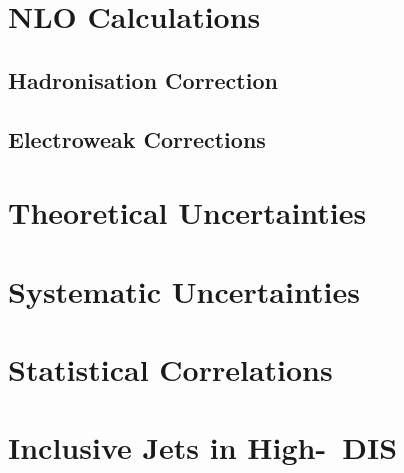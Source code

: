 \section{NLO Calculations}
\label{sec:nlopredictions}


\subsection{Hadronisation Correction}
\label{subsec:hadrcorr}

% 
\subsection{Electroweak Corrections}
\label{subsec:z0corr}



\section{Theoretical Uncertainties}
\label{sec:nlouncertainty}


\section{Systematic Uncertainties}
\label{subsec:systunc}


\section{Statistical Correlations}
\label{subsec:statcorel}


\section{Inclusive Jets in High-\qsq~DIS}
\label{sec:incljetsncdis}

